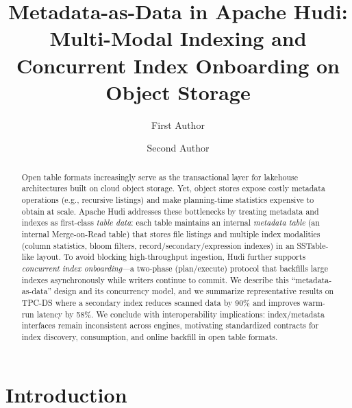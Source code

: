 \documentclass[sigconf]{acmart}
\begin{document}
\title{Metadata-as-Data in Apache Hudi: Multi-Modal Indexing and Concurrent Index Onboarding on Object Storage}

\author{First Author}

\author{Second Author}

\begin{abstract}
Open table formats increasingly serve as the transactional layer for lakehouse architectures built on cloud object storage.
Yet, object stores expose costly metadata operations (e.g., recursive listings) and make planning-time statistics expensive to obtain at scale.
Apache Hudi addresses these bottlenecks by treating metadata and indexes as first-class \emph{table data}:
each table maintains an internal \emph{metadata table} (an internal Merge-on-Read table) that stores file listings and multiple index modalities (column statistics, bloom filters, record/secondary/expression indexes) in an SSTable-like layout.
To avoid blocking high-throughput ingestion, Hudi further supports \emph{concurrent index onboarding}---a two-phase (plan/execute) protocol that backfills large indexes asynchronously while writers continue to commit.
We describe this ``metadata-as-data'' design and its concurrency model, and we summarize representative results on TPC-DS where a secondary index reduces scanned data by 90\% and improves warm-run latency by 58\%.
We conclude with interoperability implications: index/metadata interfaces remain inconsistent across engines, motivating standardized contracts for index discovery, consumption, and online backfill in open table formats.
\end{abstract}


\maketitle

\section{Introduction}
\end{document}
